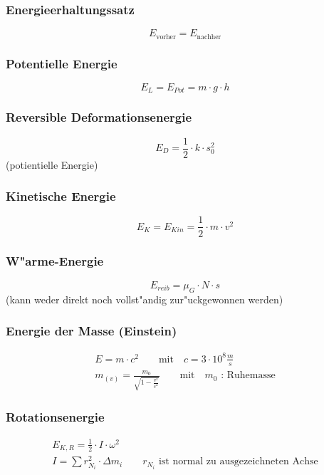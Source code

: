 \subsubsection{Energieerhaltungssatz}
\begin{equation}
	E_{\text{vorher}}=E_{\text{nachher}}
\end{equation}

\subsubsection{Potentielle Energie}
\begin{equation}
	E_L=E_{Pot}=m\cdot g\cdot h
\end{equation}

\subsubsection{Reversible Deformationsenergie}
\begin{equation}
	E_D=\frac{1}{2}\cdot k\cdot s_0^2
\end{equation}
\noindent(potientielle Energie)

\subsubsection{Kinetische Energie}
\begin{equation}
	E_K=E_{Kin}=\frac{1}{2}\cdot m\cdot v^2
\end{equation}

\subsubsection{W"arme-Energie}
\begin{equation}
	E_{reib}=\mu_G\cdot N\cdot s
\end{equation}
\noindent(kann weder direkt noch vollst"andig zur"uckgewonnen werden)

\subsubsection{Energie der Masse (Einstein)}
\begin{gather}
	E=m\cdot c^2\qquad\text{mit}\quad c=3\cdot 10^8\unit{\frac{m}{s}} \\
	m_{(v)}=\frac{m_0}{\sqrt{1-\frac{v^2}{c^2}}}\qquad\text{mit}\quad m_0\text{ : Ruhemasse}
\end{gather}

\subsubsection{Rotationsenergie}
\begin{gather}
	E_{K,R}=\frac{1}{2}\cdot I\cdot\omega^2 \\
	I=\sum r_{N_i}^2\cdot\Delta m_i\qquad r_{N_i}\text{ ist normal zu ausgezeichneten Achse}
\end{gather}

